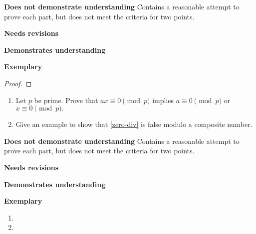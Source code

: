 \documentclass[letterpaper, 11pt]{../ximera}
\begin{document}
\begin{writeRubric}
    \item \textbf{Does not demonstrate understanding}
     Contains a reasonable attempt to prove each part, but does not meet the criteria for two points.
    \item \textbf{Needs revisions}
     
    \item \textbf{Demonstrates understanding}
    
    \item \textbf{Exemplary}
        
\end{writeRubric}
                                       \begin{proof}
 
\end{proof}


\begin{ex}
   	\begin{enumerate}[label=(\alph*)] 
		\item\label{zero-div} Let $p$ be prime. Prove that $ax\equiv 0\pmod{p}$ implies $a\equiv 0\pmod{p}$ or $x\equiv 0\pmod{p}.$ 

		\item Give an example to show that \ref{zero-div} is false modulo a composite number.
	\end{enumerate}
\end{ex}

\begin{writeRubric}
    \item \textbf{Does not demonstrate understanding}
     Contains a reasonable attempt to prove each part, but does not meet the criteria for two points.
    \item \textbf{Needs revisions}
     
    \item \textbf{Demonstrates understanding}
    
    \item \textbf{Exemplary}
        
\end{writeRubric}
                                       \begin{solution}
    	\begin{enumerate}[label=(\alph*)] 
		\item %

		\item %
	\end{enumerate}
\end{solution}
\end{document}
